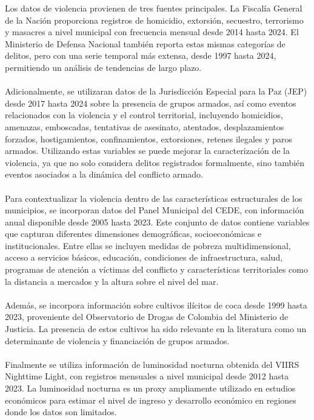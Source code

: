 Los datos de violencia provienen de tres fuentes principales. La Fiscalía General de la Nación proporciona registros de homicidio, extorsión, secuestro, terrorismo y masacres a nivel municipal con frecuencia mensual desde 2014 hasta 2024. El Ministerio de Defensa Nacional también reporta estas mismas categorías de delitos, pero con una serie temporal más extensa, desde 1997 hasta 2024, permitiendo un análisis de tendencias de largo plazo. 
\\\\
Adicionalmente, se utilizaran datos de la Jurisdicción Especial para la Paz (JEP) desde 2017 hasta 2024 sobre la presencia de grupos armados, así como eventos relacionados con la violencia y el control territorial, incluyendo homicidios, amenazas, emboscadas, tentativas de asesinato, atentados, desplazamientos forzados, hostigamientos, confinamientos, extorsiones, retenes ilegales y paros armados. Utilizando estas variables se puede mejorar la caracterización de la violencia, ya que no solo considera delitos registrados formalmente, sino también eventos asociados a la dinámica del conflicto armado.
\\\\
Para contextualizar la violencia dentro de las características estructurales de los municipios, se incorporan datos del Panel Municipal del CEDE, con información anual disponible desde 2005 hasta 2023. Este conjunto de datos contiene variables que capturan diferentes dimensiones demográficas, socioeconómicas e institucionales. Entre ellas se incluyen medidas de pobreza multidimensional, acceso a servicios básicos, educación, condiciones de infraestructura, salud, programas de atención a víctimas del conflicto y características territoriales como la distancia a mercados y la altura sobre el nivel del mar.
\\\\
Además, se incorpora información sobre cultivos ilícitos de coca desde 1999 hasta 2023, proveniente del Observatorio de Drogas de Colombia del Ministerio de Justicia. La presencia de estos cultivos ha sido relevante en la literatura como un determinante de violencia y financiación de grupos armados. 
\\\\
Finalmente se utiliza información de luminosidad nocturna obtenida del VIIRS Nighttime Light, con registros mensuales a nivel municipal desde 2012 hasta 2023. La luminosidad nocturna es un proxy ampliamente utilizado en estudios económicos para estimar el nivel de ingreso y desarrollo económico en regiones donde los datos son limitados.
